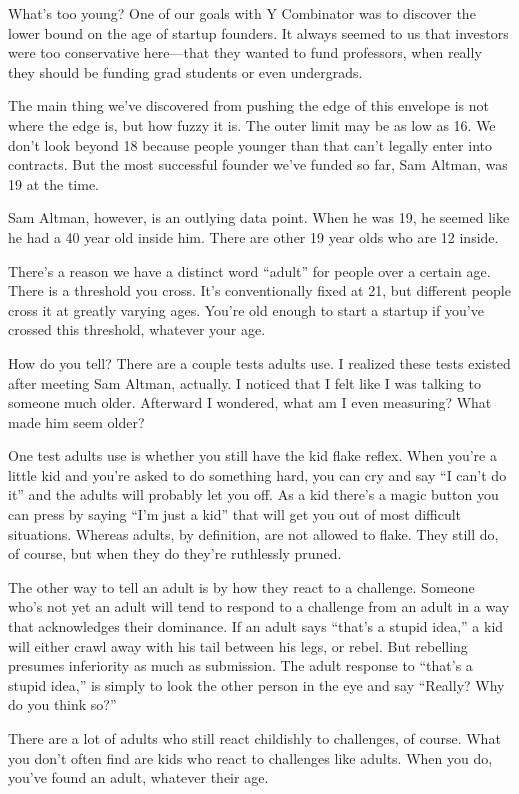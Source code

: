 \documentclass[12pt]{book}
\begin{document}
What's too young? One of our goals with Y Combinator was to discover the
lower bound on the age of startup founders. It always seemed to us that
investors were too conservative here---that they wanted to fund
professors, when really they should be funding grad students or even
undergrads.

The main thing we've discovered from pushing the edge of this envelope
is not where the edge is, but how fuzzy it is. The outer limit may be as
low as 16. We don't look beyond 18 because people younger than that
can't legally enter into contracts. But the most successful founder
we've funded so far, Sam Altman, was 19 at the time.

Sam Altman, however, is an outlying data point. When he was 19, he
seemed like he had a 40 year old inside him. There are other 19 year
olds who are 12 inside.

There's a reason we have a distinct word ``adult'' for people over a
certain age. There is a threshold you cross. It's conventionally fixed
at 21, but different people cross it at greatly varying ages. You're old
enough to start a startup if you've crossed this threshold, whatever
your age.

How do you tell? There are a couple tests adults use. I realized these
tests existed after meeting Sam Altman, actually. I noticed that I felt
like I was talking to someone much older. Afterward I wondered, what am
I even measuring? What made him seem older?

One test adults use is whether you still have the kid flake reflex. When
you're a little kid and you're asked to do something hard, you can cry
and say ``I can't do it'' and the adults will probably let you off. As a
kid there's a magic button you can press by saying ``I'm just a kid''
that will get you out of most difficult situations. Whereas adults, by
definition, are not allowed to flake. They still do, of course, but when
they do they're ruthlessly pruned.

The other way to tell an adult is by how they react to a challenge.
Someone who's not yet an adult will tend to respond to a challenge from
an adult in a way that acknowledges their dominance. If an adult says
``that's a stupid idea,'' a kid will either crawl away with his tail
between his legs, or rebel. But rebelling presumes inferiority as much
as submission. The adult response to ``that's a stupid idea,'' is simply
to look the other person in the eye and say ``Really? Why do you think
so?''

There are a lot of adults who still react childishly to challenges, of
course. What you don't often find are kids who react to challenges like
adults. When you do, you've found an adult, whatever their age.
\end{document}
